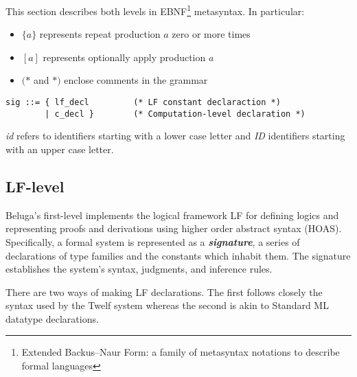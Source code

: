 \documentclass[11pt]{article}
\begin{document}
This section describes both levels in EBNF\footnote{Extended Backus–Naur Form: a family of metasyntax notations to describe formal languages} metasyntax.
In particular:
\begin{itemize}
\item $\{a\}$ represents repeat production $a$ zero or more times
\item $[a]$ represents optionally apply production $a$
\item $(*$ and $*)$ enclose comments in the grammar
\end{itemize}
\begin{verbatim}
sig ::= { lf_decl         (* LF constant declaraction *)
        | c_decl }        (* Computation-level declaration *)
\end{verbatim}
\textit{id} refers to identifiers starting with a lower case letter and \textit{ID} identifiers starting with an upper case letter.



\subsection{LF-level}
Beluga's first-level implements the logical framework LF for defining logics and representing proofs and derivations using higher order abstract syntax (HOAS).
Specifically, a formal system is represented as a \textit{\textbf{signature}}, a series of declarations of type families and the constants which inhabit them.
The signature establishes the system's syntax, judgments, and inference rules.

There are two ways of making LF declarations.
The first follows closely the syntax used by the Twelf system whereas the second is akin to Standard ML datatype declarations.
\end{document}
